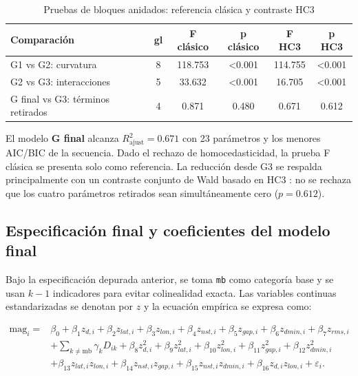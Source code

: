 \documentclass{style}
\begin{document}
\begin{table}[H]
    \centering
    \caption{Pruebas de bloques anidados: referencia clásica y contraste HC3}
    \scriptsize
    \setlength{\tabcolsep}{12pt} 
    \begin{tabular}{lccccc}
    \toprule
    \textbf{Comparación} & \textbf{gl} & \textbf{F clásico} & \textbf{p clásico} & \textbf{F HC3} & \textbf{p HC3} \\
    \midrule
    G1 vs G2: curvatura & 8 & 118.753 & <0.001 & 114.755 & <0.001 \\
    G2 vs G3: interacciones & 5 & 33.632 & <0.001 & 16.705 & <0.001 \\
    G final vs G3: términos retirados & 4 & 0.871 & 0.480 & 0.671 & 0.612 \\
    \bottomrule
    \end{tabular}
\end{table}

El modelo \textbf{G final} alcanza $R^2_{\text{ajust}} = 0.671$ con 23 parámetros y los menores AIC/BIC de la secuencia. Dado el rechazo de homocedasticidad, la prueba F clásica se presenta solo como referencia. La reducción desde G3 se respalda principalmente con un contraste conjunto de Wald basado en HC3 \cite{mackinnonwhite1985}: no se rechaza que los cuatro parámetros retirados sean simultáneamente cero ($p = 0.612$).




\subsection{Especificación final y coeficientes del modelo final}

Bajo la especificación depurada anterior, se toma \texttt{mb} como categoría base y se usan $k-1$ indicadores para evitar colinealidad exacta. Las variables continuas estandarizadas se denotan por $z$ y la ecuación empírica se expresa como:

\begin{align*}
\text{mag}_i={}&\beta_0+\beta_1z_{d,i}+\beta_2z_{lat,i}+\beta_3z_{lon,i}
+\beta_4z_{nst,i}+\beta_5z_{gap,i}+\beta_6z_{dmin,i}+\beta_7z_{rms,i}\\
&+\sum_{k\neq \mathrm{mb}}\gamma_kD_{ik}
+\beta_8z_{d,i}^{2}+\beta_9z_{lat,i}^{2}+\beta_{10}z_{lon,i}^{2}
+\beta_{11}z_{gap,i}^{2}+\beta_{12}z_{dmin,i}^{2}\\
&+\beta_{13}z_{lat,i}z_{lon,i}+\beta_{14}z_{nst,i}z_{gap,i}
+\beta_{15}z_{nst,i}z_{dmin,i}+\beta_{16}z_{d,i}z_{lon,i}+\varepsilon_i .
\end{align*}
\end{document}
